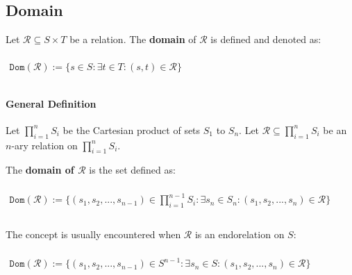 \subsection{Domain}
\label{sec:domain}

Let $\mathcal{R} \subseteq S \times T$ be a relation. The
\textbf{domain} of $\mathcal{R}$ is defined and denoted as:

\begin{math}
  \begin{array}{c}
    \\
    \mathtt{Dom}(\mathcal{R}) := \{ s \in S: \exists t \in T: (s, t) \in \mathcal{R} \}\\
    \\
  \end{array}
\end{math}

\paragraph{General Definition}

Let $\displaystyle \prod_{i=1}^n S_i$ be the Cartesian product of sets
$S_1$ to $S_n$. Let
$\mathcal{R} \subseteq \displaystyle \prod_{i=1}^n S_i$ be an $n$-ary
relation on $\displaystyle \prod_{i=1}^n S_i$.

The \textbf{domain of $\mathcal{R}$} is the set defined as:

\begin{math}
  \begin{array}{c}
    \\
    \mathtt{Dom}(\mathcal{R}) := \{ (s_1, s_2, ..., s_{n-1}) \in \displaystyle \prod_{i=1}^{n-1} S_i : \exists s_n \in S_n : (s_1, s_2, ..., s_n) \in \mathcal{R} \}\\
    \\
  \end{array}
\end{math}

The concept is usually encountered when $\mathcal{R}$ is an
endorelation on $S$:

\begin{math}
  \begin{array}{c}
    \\
    \mathtt{Dom}(\mathcal{R}) := \{ (s_1, s_2, ..., s_{n-1}) \in S^{n-1} : \exists s_n \in S : (s_1, s_2, ..., s_n) \in \mathcal{R} \}\\
    \\
  \end{array}
\end{math}


